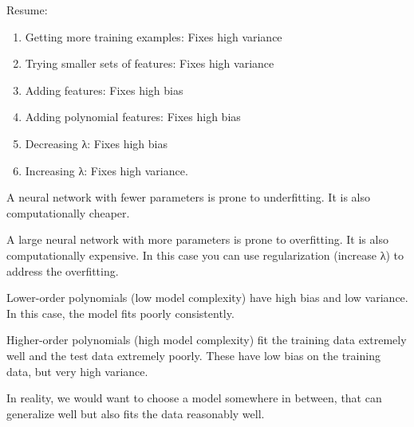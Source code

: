 \documentclass[12pt,a4paper]{report}
\begin{document}
	Resume:
	
	\begin{enumerate}
	\item Getting more training examples: Fixes high variance
\item Trying smaller sets of features: Fixes high variance
\item Adding features: Fixes high bias
\item Adding polynomial features: Fixes high bias
\item Decreasing λ: Fixes high bias
\item Increasing λ: Fixes high variance.
	\end{enumerate}
	
	A neural network with fewer parameters is prone to underfitting. It is also computationally cheaper.
	
A large neural network with more parameters is prone to overfitting. It is also computationally expensive. In this case you can use regularization (increase λ) to address the overfitting.

Lower-order polynomials (low model complexity) have high bias and low variance. In this case, the model fits poorly consistently.

Higher-order polynomials (high model complexity) fit the training data extremely well and the test data extremely poorly. These have low bias on the training data, but very high variance.

In reality, we would want to choose a model somewhere in between, that can generalize well but also fits the data reasonably well.
	
	
\end{document}
